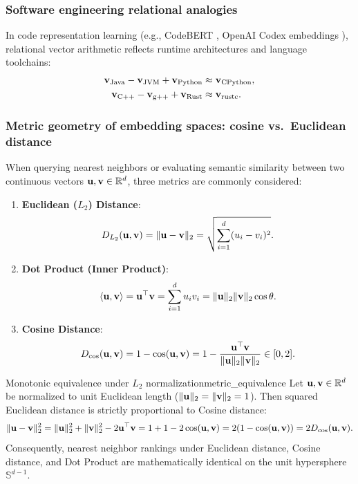 \documentclass[../../../main.tex]{subfiles}
\begin{document}
\subsubsection{Software engineering relational analogies}
In code representation learning (e.g., CodeBERT \cite{feng2020codebert}, OpenAI Codex embeddings \cite{chen2021codex}), relational vector arithmetic reflects runtime architectures and language toolchains:
\begin{align}
\label{eq:se_analogy_runtime}
\mathbf{v}_{\text{Java}} - \mathbf{v}_{\text{JVM}} + \mathbf{v}_{\text{Python}} &\approx \mathbf{v}_{\text{CPython}}, \\
\label{eq:se_analogy_compiler}
\mathbf{v}_{\text{C++}} - \mathbf{v}_{\text{g++}} + \mathbf{v}_{\text{Rust}} &\approx \mathbf{v}_{\text{rustc}}.
\end{align}

\subsubsection{Metric geometry of embedding spaces: cosine vs.~Euclidean distance}
\label{subsec:metric_geometry}

When querying nearest neighbors or evaluating semantic similarity between two continuous vectors $\mathbf{u}, \mathbf{v} \in \mathbb{R}^d$, three metrics are commonly considered:
\begin{enumerate}
    \item \textbf{Euclidean ($L_2$) Distance}:
    \begin{equation}
    \label{eq:euclidean_dist}
    D_{L_2}(\mathbf{u}, \mathbf{v}) = \|\mathbf{u} - \mathbf{v}\|_2 = \sqrt{\sum_{i=1}^d (u_i - v_i)^2}.
    \end{equation}
    \item \textbf{Dot Product (Inner Product)}:
    \begin{equation}
    \label{eq:dot_prod_metric}
    \langle\mathbf{u}, \mathbf{v}\rangle = \mathbf{u}^\top \mathbf{v} = \sum_{i=1}^d u_i v_i = \|\mathbf{u}\|_2 \|\mathbf{v}\|_2 \cos \theta.
    \end{equation}
    \item \textbf{Cosine Distance}:
    \begin{equation}
    \label{eq:cosine_dist_def}
    D_{\cos}(\mathbf{u}, \mathbf{v}) = 1 - \cos(\mathbf{u}, \mathbf{v}) = 1 - \frac{\mathbf{u}^\top \mathbf{v}}{\|\mathbf{u}\|_2 \|\mathbf{v}\|_2} \in [0, 2].
    \end{equation}
\end{enumerate}

\begin{theorem}{Monotonic equivalence under $L_2$ normalization}{metric_equivalence}
Let $\mathbf{u}, \mathbf{v} \in \mathbb{R}^d$ be normalized to unit Euclidean length ($\|\mathbf{u}\|_2 = \|\mathbf{v}\|_2 = 1$). Then squared Euclidean distance is strictly proportional to Cosine distance:
\begin{equation}
\label{eq:unit_norm_equiv}
\|\mathbf{u} - \mathbf{v}\|_2^2 = \|\mathbf{u}\|_2^2 + \|\mathbf{v}\|_2^2 - 2 \mathbf{u}^\top \mathbf{v} = 1 + 1 - 2 \cos(\mathbf{u}, \mathbf{v}) = 2(1 - \cos(\mathbf{u}, \mathbf{v})) = 2 D_{\cos}(\mathbf{u}, \mathbf{v}).
\end{equation}
Consequently, nearest neighbor rankings under Euclidean distance, Cosine distance, and Dot Product are mathematically identical on the unit hypersphere $\mathbb{S}^{d-1}$.
\end{theorem}
\end{document}
